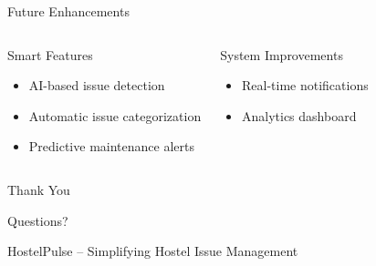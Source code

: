 \documentclass{beamer}
\begin{document}
\begin{frame}{Future Enhancements}

\begin{columns}


\begin{block}{Smart Features}
\begin{itemize}
\item AI-based issue detection
\item Automatic issue categorization
\item Predictive maintenance alerts
\end{itemize}
\end{block}


\begin{block}{System Improvements}
\begin{itemize}
\item Real-time notifications

\item Analytics dashboard
\end{itemize}
\end{block}

\end{columns}

\end{frame}

\begin{frame}

\centering

\Huge Thank You

\vspace{0.5cm}

\Large Questions?

\vspace{0.7cm}

\small
HostelPulse – Simplifying Hostel Issue Management

\end{frame}
\end{document}
